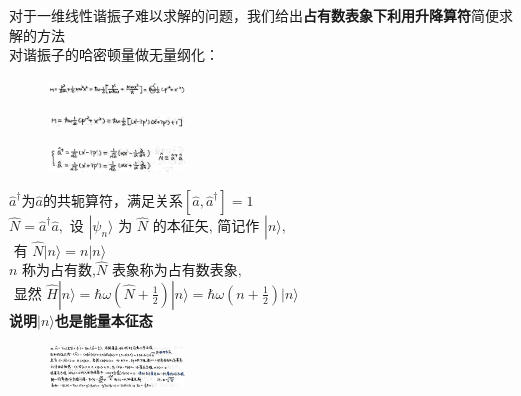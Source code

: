 \documentclass[a4paper,8pt]{extarticle} %
\newcommand{\black}[1]{\textbf{#1}}
\begin{document}
\begin{multicols}{3}
对于一维线性谐振子难以求解的问题，我们给出\black{占有数表象下利用升降算符}简便求解的方法\\
对谐振子的哈密顿量做无量纲化：
\begin{figure}[H]
    \vspace{-0.5cm}
    \centering
    \includegraphics[width=0.32\textwidth]{images/22.png}
    \vspace{-0.6cm}
\end{figure}
\begin{figure}[H]
    \vspace{-0.5cm}
    \centering
    \includegraphics[width=0.32\textwidth]{images/23.png}
    \vspace{-0.6cm}
\end{figure}
\begin{figure}[H]
    \vspace{-0.5cm}
    \centering
    \includegraphics[width=0.32\textwidth]{images/24.png}
    \vspace{-0.6cm}
\end{figure}
$\hat{a}^\dagger$为$\hat{a}$的共轭算符，满足关系$[\hat{a},\hat{a}^\dagger]=1$\\
$\hat{N} = \hat{a}^{\dagger}\hat{a}, \text{ 设 }|\psi_n\rangle \text{ 为 } \hat{N} \text{ 的本征矢,} \text{ 简记作 } |n\rangle,$\\
$ \text{ 有 } \hat{N}|n\rangle = n|n\rangle$\\
$ n \text{ 称为占有数,} \hat{N} \text{ 表象称为占有数表象,} $\\
$\text{ 显然 } \hat{H}|n\rangle = \hbar\omega(\hat{N}+\frac{1}{2})|n\rangle = \hbar\omega(n+\frac{1}{2})|n\rangle$\\
\black{说明$|n\rangle$也是能量本征态}\\
\begin{figure}[H]
    \vspace{-0.5cm}
    \centering
    \includegraphics[width=0.32\textwidth]{images/25.png}
    \vspace{-0.6cm}

\end{figure}
\end{multicols}
\end{document}
